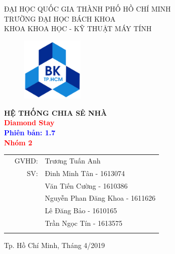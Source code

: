 \documentclass[a4paper]{article}
\begin{document}
\begin{titlepage}
\begin{center}
ĐẠI HỌC QUỐC GIA THÀNH PHỐ HỒ CHÍ MINH \\
TRƯỜNG ĐẠI HỌC BÁCH KHOA \\
KHOA KHOA HỌC - KỸ THUẬT MÁY TÍNH 
\end{center}

\vspace{1cm}

\begin{figure}[h!]
\begin{center}
\includegraphics[width=3cm]{Image/hcmut.png}
\end{center}
\end{figure}

\vspace{0.5cm}

\begin{center}
\textbf{\huge HỆ THỐNG CHIA SẺ NHÀ}\\
\vspace{0.25cm}
\textbf{\Huge \textcolor{red}{Diamond Stay}}\\
\textbf{\huge \textcolor{blue}{Phiên bản: 1.7}}\\
\vspace{1.5cm}
\textcolor{red}{\textbf{\huge  Nhóm 2}}

\end{center}

\vspace{0.7cm}


\begin{table}[h]
\begin{tabular}{rrl}
\hspace{5 cm} & GVHD: & Trương Tuấn Anh\\
& SV: & Đinh Minh Tân - 1613074 \\
& & Văn Tiến Cường - 1610386\\
& & Nguyễn Phan Đăng Khoa - 1611626\\
& & Lê Đăng Bảo - 1610165\\
& & Trần Ngọc Tín - 1613575\\
\vspace{2.3cm}

\end{tabular}
\end{table}

\begin{center}
{\footnotesize Tp. Hồ Chí Minh, Tháng 4/2019}
\end{center}
\end{titlepage}
\end{document}
